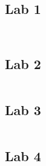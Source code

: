 \documentclass{article}
\begin{document}
\subsection*{Lab 1}
\inputminted{text}{../output/Lab1.py.out}
\inputminted{text}{../output/Lab1.2.py.out}
\subsection*{Lab 2}

\inputminted{text}{../output/Lab2.py.out} \newpage
\subsection*{Lab 3}
\inputminted{text}{../output/Lab3.py.out} \newpage

\subsection*{Lab 4}
\inputminted{text}{../output/Lab4.out}


\inputminted{text}{../output/Lab4.out}

\end{document}
